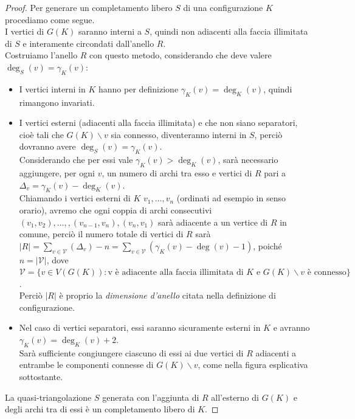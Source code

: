 \documentclass[a4paper,12pt,titlepage]{report}
\begin{document}
    \begin{proof}
    	Per generare un completamento libero $S$ di una configurazione $K$ procediamo come segue.
    	\\I vertici di $G(K)$ saranno interni a $S$, quindi non adiacenti alla faccia illimitata di $S$ e interamente circondati dall'anello $R$.
    	\\Costruiamo l'anello $R$ con questo metodo, considerando che deve valere $\deg_S(v) = \gamma_K(v)$:
    	\begin{itemize}
    		\item I vertici interni in $K$ hanno per definizione $\gamma_K(v) = \deg_K(v)$, quindi rimangono invariati.
    		\item I vertici esterni (adiacenti alla faccia illimitata) e che non siano separatori, cioè tali che $G(K) \smallsetminus v$ sia connesso, diventeranno interni in $S$, perciò dovranno avere $\deg_S(v) = \gamma_K(v)$.
    		\\Considerando che per essi vale $\gamma_K(v) > \deg_K(v)$, sarà necessario aggiungere, per ogni $v$, un numero di archi tra esso e vertici di $R$ pari a $\Delta_v = \gamma_K(v) - \deg_K(v)$.
    		\\Chiamando i vertici esterni di $K$ $v_1, \dots, v_n$ (ordinati ad esempio in senso orario), avremo che ogni coppia di archi consecutivi $(v_1, v_2), \dots, , (v_{n-1}, v_n), (v_n, v_1)$ sarà adiacente a un vertice di $R$ in comune, perciò il numero totale di vertici di $R$ sarà $\lvert R \rvert = \sum_{v \in \mathcal{V}} (\Delta_v) - n = \sum_{v \in \mathcal{V}} (\gamma_K(v) - \deg(v) - 1)$, poiché $n = \lvert \mathcal{V} \rvert$, dove $\mathcal{V} = \{v \in V(G(K)) : \text{v è adiacente alla faccia illimitata di $K$ e } G(K) \smallsetminus v \text{ è connesso}\}$.
    		\\Perciò $\lvert R \rvert$ è proprio la \emph{dimensione d'anello} citata nella definizione di configurazione.
    		\item Nel caso di vertici separatori, essi saranno sicuramente esterni in $K$ e avranno $\gamma_K(v) = \deg_K(v) + 2$.
    		\\Sarà sufficiente congiungere ciascuno di essi ai due vertici di $R$ adiacenti a entrambe le componenti connesse di $G(K) \smallsetminus v$, come nella figura esplicativa sottostante. 
    	\end{itemize}
    	La quasi-triangolazione $S$ generata con l'aggiunta di $R$ all'esterno di $G(K)$ e degli archi tra di essi è un completamento libero di $K$.
    \end{proof}
    
\end{document}
